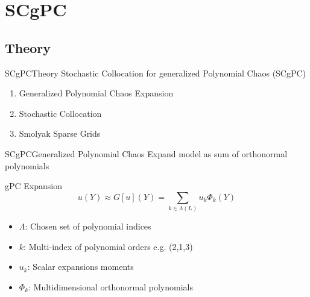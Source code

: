 \documentclass{beamer}
\begin{document}
\AtBeginSubsection[]{\begin{frame}[shrink=10]{Outline}\vspace{-20pt}
  \begin{columns}
    \begin{column}{0.1\textwidth}
    \end{column}
    \begin{column}{0.9\textwidth}
      \setcounter{tocdepth}{2}
      \tableofcontents[currentsection,currentsubsection,subsectionstyle=show/shaded/hide]%
    \end{column}
  \end{columns}
\end{frame}}






\section{SCgPC}
\subsection{Theory}
\begin{frame}{SCgPC}{Theory}\vspace{-20pt}
  \vfill
  Stochastic Collocation for generalized Polynomial Chaos (SCgPC)
  \vfill
  \begin{enumerate}
    \item Generalized Polynomial Chaos Expansion
  \vfill
    \item Stochastic Collocation
  \vfill
    \item Smolyak Sparse Grids
  \end{enumerate}
  \vfill
\end{frame}

\begin{frame}{SCgPC}{Generalized Polynomial Chaos}\vspace{-20pt}
  \vfill
  Expand model as sum of orthonormal polynomials
  \vfill
  \begin{block}{gPC Expansion}
    \begin{equation*}
    u(Y) \approx G[u](Y) = \sum_{k\in\Lambda(L)} u_k \Phi_k(Y)
    \end{equation*}
  \end{block}
  \vfill
  \begin{itemize}
    \item $\Lambda$: Chosen set of polynomial indices
    \item $k$: Multi-index of polynomial orders e.g. (2,1,3)
    \item $u_k$: Scalar expansions moments
    \item $\Phi_k$: Multidimensional orthonormal polynomials
  \end{itemize}
  \vfill
\end{frame}
\end{document}
